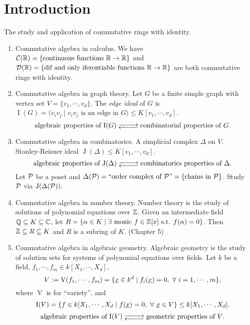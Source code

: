 \chapter*{Introduction}


The study and application of commutative rings with identity.
    \begin{enumerate}
        \item Commutative algebra in calculus. We have $\mathcal{C}(\mathbb{R}) = \{\text{continuous functions }\mathbb{R} \to \mathbb{R}\}$ and $\mathcal{D}(\mathbb{R}) = \{\text{dif and only iferentiable functions }\mathbb{R} \to \mathbb{R}\}$ are both commutative rings with identity.
        \item Commutative algebra in graph theory. Let $G$ be a finite simple graph with vertex set $V = \{v_1,\cdots,v_d\}$. The \emph{edge ideal} of $G$ is $\operatorname{I}(G) = \langle v_iv_j \mid v_iv_j \text{ is an edge in }G \rangle \leq K[v_1,\cdots,v_d]$. 
            \[\text{algebraic properties of $\operatorname{I}(G)$} \myrightleftarrows{\rule{0.8cm}{0cm}} \text{combinatorial properties of $G$}.\]
        \item Commutative algebra in combinatorics.  A simplicial complex $\Delta$ on $V$. Stanley-Reisner ideal $\operatorname{J}(\Delta) \leq K[v_1,\cdots,v_d]$. 
            \[\text{algebraic properties of $\operatorname{J}(\Delta)$} \myrightleftarrows{\rule{0.8cm}{0cm}} \text{combinatorics properties of $\Delta$}.\]
            Let $\mathcal{P}$ be a poset and $\Delta(\mathcal{P}) = ``\text{order complex of $\mathcal{P}$''} = \{\text{chains in $\mathcal{P}$}\}$. Study $\mathcal{P}$ via $\operatorname{J}(\Delta(\mathcal{P}))$. 
        \item Commutative algebra in number theory. Number theory is the study of solutions of polynomial equations over $\mathbb{Z}$. Given an intermediate field $\mathbb{Q} \subseteq K \subseteq \mathbb{C}$, let $R = \{\alpha \in K \mid \exists \  \text{monic }f \in \mathbb{Z}[x] \text{ s.t. } f(\alpha) = 0\}$. Then $\mathbb{Z} \subseteq R \subseteq K$ and $R$ is a subring of $K$. (Chapter 5)
        \item Commutative algebra in algebraic geometry. Algebraic geometry is the study of solution sets for systems of polynomial equations over fields. Let $k$ be a field, $f_1,\cdots,f_m \in k[X_1,\cdots,X_d]$, 
            \[V := \operatorname{V}(f_1,\cdots,f_m) = \{\underline x \in k^d \mid f_i(\underline x) = 0,\ \forall \  i = 1,\cdots,m\},\] 
            where $\operatorname{V}$ is for ``variety'', and 
            \[\operatorname{I}(V) = \{f \in k[X_1,\cdots,X_d \mid f(\underline x) = 0,\ \forall \  \underline x \in V\} \leq k[X_1,\cdots,X_d].\] 
            \[\text{algebraic properties of $\operatorname{I}(V)$} \myrightleftarrows{\rule{0.8cm}{0cm}} \text{geometric properties of $V$}.\]
    \end{enumerate}

